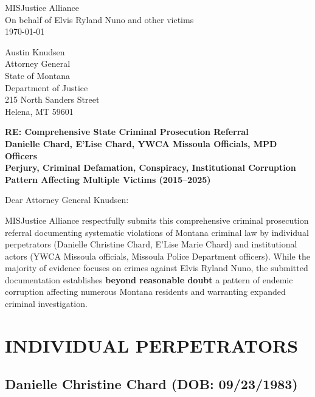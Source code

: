 \documentclass[12pt,oneside]{article}
\begin{document}
\begin{flushleft}

MISJustice Alliance \\
On behalf of Elvis Ryland Nuno and other victims \\
\today

\vspace{0.3in}

Austin Knudsen \\
Attorney General \\
State of Montana \\
Department of Justice \\
215 North Sanders Street \\
Helena, MT 59601

\vspace{0.3in}

\textbf{RE: Comprehensive State Criminal Prosecution Referral} \\
\textbf{Danielle Chard, E'Lise Chard, YWCA Missoula Officials, MPD Officers} \\
\textbf{Perjury, Criminal Defamation, Conspiracy, Institutional Corruption} \\
\textbf{Pattern Affecting Multiple Victims (2015--2025)}

\vspace{0.3in}

Dear Attorney General Knudsen:

\vspace{0.2in}

MISJustice Alliance respectfully submits this comprehensive criminal prosecution referral documenting systematic violations of Montana criminal law by individual perpetrators (Danielle Christine Chard, E'Lise Marie Chard) and institutional actors (YWCA Missoula officials, Missoula Police Department officers). While the majority of evidence focuses on crimes against Elvis Ryland Nuno, the submitted documentation establishes \textbf{beyond reasonable doubt} a pattern of endemic corruption affecting numerous Montana residents and warranting expanded criminal investigation.

\section*{INDIVIDUAL PERPETRATORS}

\subsection*{Danielle Christine Chard (DOB: 09/23/1983)}


\end{flushleft}
\end{document}
